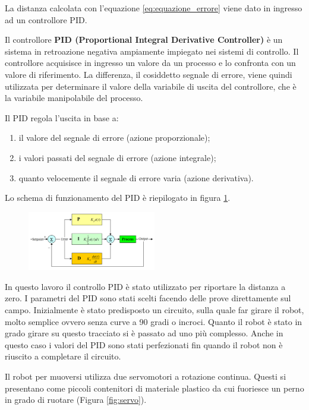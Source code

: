 \documentclass[twoside,twocolumn]{article}
\begin{document}
La distanza calcolata con l'equazione \ref{eq:equazione_errore} viene dato in ingresso ad un controllore PID.

Il controllore \textbf{PID (Proportional Integral Derivative Controller)} è un sistema in retroazione negativa ampiamente impiegato nei sistemi di controllo. Il controllore acquisisce in ingresso un valore da un processo e lo confronta con un valore di riferimento. La differenza, il cosiddetto segnale di errore, viene quindi utilizzata per determinare il valore della variabile di uscita del controllore, che è la variabile manipolabile del processo.

Il PID regola l'uscita in base a:
\begin{enumerate}
	\item il valore del segnale di errore (azione proporzionale);
	\item i valori passati del segnale di errore (azione integrale);
	\item quanto velocemente il segnale di errore varia (azione derivativa).
\end{enumerate}

Lo schema di funzionamento del PID è riepilogato  in figura \ref{fig:pid}.

\begin{figure}[h]
	\centering
	\includegraphics[width=0.5\textwidth]{immagini/PID}
	\caption{}
	\label{fig:pid}
\end{figure}

In questo lavoro il controllo PID è stato utilizzato per riportare la distanza a zero. I parametri del PID sono stati scelti facendo delle prove direttamente sul campo. Inizialmente è stato predisposto un circuito, sulla quale far girare il robot, molto semplice ovvero senza curve a 90 gradi o incroci. Quanto il robot è stato in grado girare su questo tracciato si è passato ad uno più complesso. Anche in questo caso i valori del PID sono stati perfezionati fin quando il robot non è riuscito a completare il circuito.

Il robot per muoversi utilizza due servomotori a rotazione continua. Questi si presentano come piccoli contenitori di materiale plastico da cui fuoriesce un perno in grado di ruotare (Figura \ref{fig:servo}). 
\end{document}
